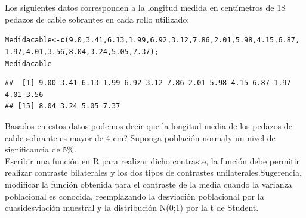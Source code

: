 \documentclass[12pt,letterpaper]{article}\usepackage[]{graphicx}\usepackage[]{color}
\makeatletter
\newcommand{\hlnum}[1]{\textcolor[rgb]{0.686,0.059,0.569}{#1}}%
\newcommand{\hlstd}[1]{\textcolor[rgb]{0.345,0.345,0.345}{#1}}%
\newcommand{\hlkwb}[1]{\textcolor[rgb]{0.69,0.353,0.396}{#1}}%
\newcommand{\hlkwd}[1]{\textcolor[rgb]{0.737,0.353,0.396}{\textbf{#1}}}%
\newenvironment{kframe}{%
 \def\at@end@of@kframe{}%
 \ifinner\ifhmode%
  \def\at@end@of@kframe{\end{minipage}}%
  \begin{minipage}{\columnwidth}%
 \fi\fi%
 \def\FrameCommand##1{\hskip\@totalleftmargin \hskip-\fboxsep
 \colorbox{shadecolor}{##1}\hskip-\fboxsep
     \hskip-\linewidth \hskip-\@totalleftmargin \hskip\columnwidth}%
 \MakeFramed {\advance\hsize-\width
   \@totalleftmargin\z@ \linewidth\hsize
   \@setminipage}}%
 {\par\unskip\endMakeFramed%
 \at@end@of@kframe}
\newenvironment{knitrout}{}{} %
\makeatother
\begin{document}
Los siguientes datos corresponden a la longitud medida en cent\'imetros de 18 pedazos de cable sobrantes en cada rollo utilizado: 
 
\begin{knitrout}
\color{fgcolor}\begin{kframe}
\begin{alltt}
\hlstd{Medidacable} \hlkwb{<-} \hlkwd{c}\hlstd{(}\hlnum{9.0}\hlstd{,} \hlnum{3.41}\hlstd{,} \hlnum{6.13}\hlstd{,} \hlnum{1.99}\hlstd{,} \hlnum{6.92}\hlstd{,} \hlnum{3.12}\hlstd{,} \hlnum{7.86}\hlstd{,} \hlnum{2.01}\hlstd{,} \hlnum{5.98}\hlstd{,} \hlnum{4.15}\hlstd{,} \hlnum{6.87}\hlstd{,}
                 \hlnum{1.97}\hlstd{,} \hlnum{4.01}\hlstd{,} \hlnum{3.56}\hlstd{,} \hlnum{8.04}\hlstd{,} \hlnum{3.24}\hlstd{,} \hlnum{5.05}\hlstd{,} \hlnum{7.37}\hlstd{);}
\hlstd{Medidacable}
\end{alltt}
\begin{verbatim}
##  [1] 9.00 3.41 6.13 1.99 6.92 3.12 7.86 2.01 5.98 4.15 6.87 1.97 4.01 3.56
## [15] 8.04 3.24 5.05 7.37
\end{verbatim}
\end{kframe}
\end{knitrout}

Basados en estos datos \¿podemos decir que la longitud media de los pedazos de cable sobrante es mayor de 4 cm? Suponga poblaci\'on normaly un nivel de significancia de 5\%.\\

Escribir una funci\'on en R para realizar dicho contraste, la funci\'on debe permitir realizar contraste bilaterales y los dos tipos de contrastes unilaterales.Sugerencia, modificar la funci\'on obtenida para el contraste de la media cuando la varianza poblacional es conocida, reemplazando la desviaci\'on poblacional por la cuasidesviaci\'on muestral y la distribuci\'on  N(0;1) por la t de Student.\\
\end{document}
